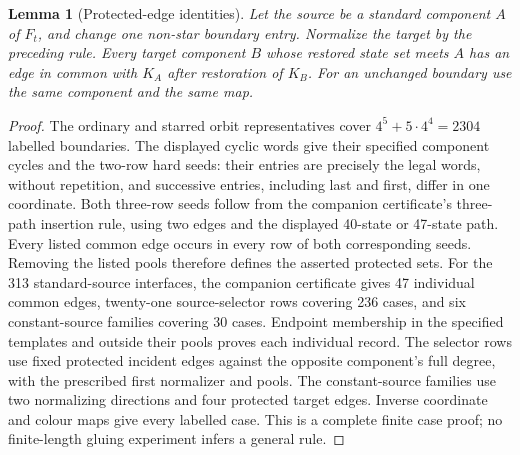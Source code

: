 \documentclass[11pt]{article}
\newtheorem{lemma}[theorem]{Lemma}
\theoremstyle{remark}
\numberwithin{equation}{section}
\numberwithin{table}{section}
\begin{document}
\begin{lemma}[Protected-edge identities]\label{lem:pentagon-protection}
Let the source be a standard component $A$ of $F_t$, and change one
non-star boundary entry. Normalize the target by the preceding rule.
Every target component $B$ whose restored state set meets $A$ has an
edge in common with $K_A$ after restoration of $K_B$.
For an unchanged boundary use the same component and the same map.
\end{lemma}
\begin{proof}
The ordinary and starred orbit representatives cover
$4^5+5\cdot4^4=2304$ labelled boundaries. The displayed cyclic words
give their specified component cycles and the two-row hard seeds:
their entries are precisely the legal words, without repetition,
and successive entries, including last and first, differ in one
coordinate. Both three-row seeds follow from the companion certificate's
three-path insertion rule, using two edges and the displayed
40-state or 47-state path. Every listed common edge occurs in
every row of both corresponding seeds.
Removing the listed pools therefore defines the asserted protected sets.
For the 313 standard-source interfaces, the companion certificate gives 47
individual common edges, twenty-one source-selector rows covering 236
cases, and six constant-source families covering 30 cases.
Endpoint membership in the specified templates and outside their pools
proves each individual record. The selector rows use fixed protected
incident edges against the opposite component's full degree, with the
prescribed first normalizer and pools. The constant-source families use
two normalizing directions and four protected target edges. Inverse
coordinate and colour maps give every labelled case. This is a complete
finite case proof; no finite-length gluing experiment infers a general rule.
\end{proof}
\end{document}
